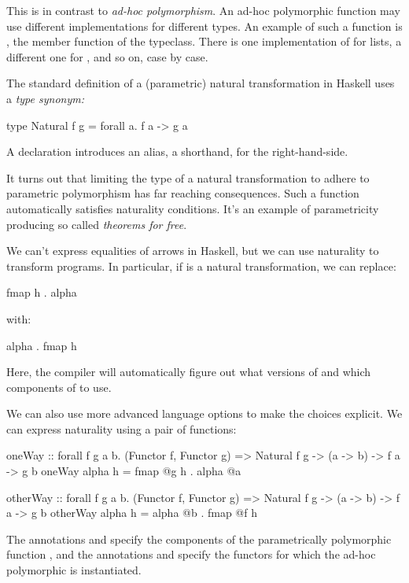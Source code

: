 \documentclass[DaoFP]{subfiles}
\begin{document}
This is in contrast to \emph{ad-hoc polymorphism}. An ad-hoc polymorphic function may use different implementations for different types. An example of such a function is , the member function of the  typeclass. There is one implementation of  for lists, a different one for , and so on, case by case. 

The standard definition of a (parametric) natural transformation in Haskell uses a \emph{type synonym:}
\begin{haskell}
type Natural f g = forall a. f a -> g a
\end{haskell}
A  declaration introduces an alias, a shorthand, for the right-hand-side.

It turns out that limiting the type of a natural transformation to adhere to parametric polymorphism has far reaching consequences. Such a function automatically satisfies naturality conditions. It's an example of parametricity producing so called \emph{theorems for free}. 

We can't express equalities of arrows in Haskell, but we can use naturality to transform programs. In particular, if  is a natural transformation, we can replace:
\begin{haskell}
fmap h . alpha
\end{haskell}
with:
\begin{haskell}
alpha . fmap h
\end{haskell}
Here, the compiler will automatically figure out what versions of  and which components of  to use. 

We can also use more advanced language options to make the choices explicit. We can express naturality using a pair of functions: 
\begin{haskell}
oneWay :: 
  forall f g a b. (Functor f, Functor g) => 
  Natural f g -> (a -> b) -> f a -> g b
oneWay alpha h = fmap @g h . alpha @a
\end{haskell}
\begin{haskell}
otherWay :: 
  forall f g a b. (Functor f, Functor g) => 
  Natural f g -> (a -> b) -> f a -> g b
otherWay alpha h = alpha @b . fmap @f h
\end{haskell}
The annotations  and  specify the components of the parametrically polymorphic function , and the annotations  and  specify the functors for which the ad-hoc polymorphic  is instantiated.
\end{document}
